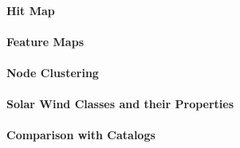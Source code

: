 \paragraph{Hit Map}

\paragraph{Feature Maps}

\paragraph{Node Clustering}

\paragraph{Solar Wind Classes and their Properties}

\paragraph{Comparison with Catalogs}